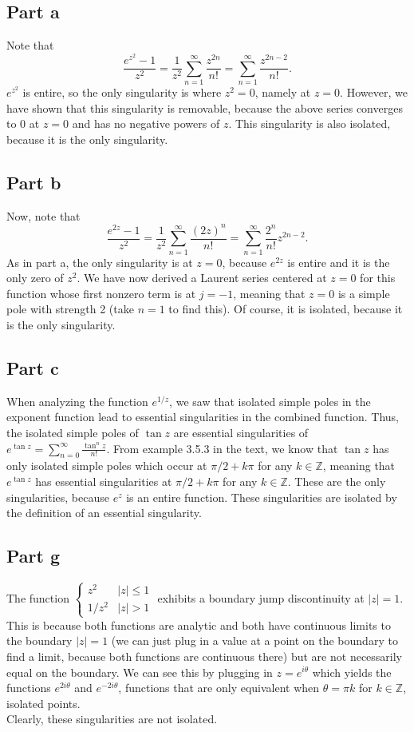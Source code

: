 \documentclass{article}
\begin{document}
\subsection{Part a}
Note that
\[
\frac{e^{z^2}-1}{z^2}=\frac{1}{z^2}\sum_{n=1}^\infty\frac{z^{2n}}{n!}=\sum_{n=1}^\infty\frac{z^{2n-2}}{n!}.
\]
$e^{z^2}$ is entire, so the only singularity is where $z^2=0$, namely at $z=0$. However, we have shown that this singularity is removable, because the above series converges to 0 at $z=0$ and has no negative powers of $z$. This singularity is also isolated, because it is the only singularity.  

\subsection{Part b}
Now, note that 
\[
\frac{e^{2z}-1}{z^2}=\frac{1}{z^2}\sum_{n=1}^\infty\frac{(2z)^n}{n!}=\sum_{n=1}^\infty\frac{2^n}{n!}z^{2n-2}.
\]
As in part a, the only singularity is at $z=0$, because $e^{2z}$ is entire and it is the only zero of $z^2$. We have now derived a Laurent series centered at $z=0$ for this function whose first nonzero term is at $j=-1$, meaning that $z=0$ is a simple pole with strength 2 (take $n=1$ to find this). Of course, it is isolated, because it is the only singularity.  

\subsection{Part c}
When analyzing the function $e^{1/z}$, we saw that isolated simple poles in the exponent function lead to essential singularities in the combined function. Thus, the isolated simple poles of $\tan{z}$ are essential singularities of $e^{\tan z}=\sum_{n=0}^\infty\frac{\tan^nz}{n!}$. From example 3.5.3 in the text, we know that $\tan{z}$ has only isolated simple poles which occur at $\pi/2+k\pi$ for any $k\in\mathbb{Z}$, meaning that $e^{\tan z}$ has essential singularities at $\pi/2+k\pi$ for any $k\in\mathbb{Z}$. These are the only singularities, because $e^z$ is an entire function. These singularities are isolated by the definition of an essential singularity. 

\subsection{Part g}
The function $\begin{cases} z^2 & |z| \leq 1 \\ 1/z^2 & |z| > 1 \end{cases}$ exhibits a boundary jump discontinuity at $|z|=1$. This is because both functions are analytic and both have continuous limits to the boundary $|z|=1$ (we can just plug in a value at a point on the boundary to find a limit, because both functions are continuous there) but are not necessarily equal on the boundary. We can see this by plugging in $z=e^{i\theta}$ which yields the functions $e^{2i\theta}$ and $e^{-2i\theta}$, functions that are only equivalent when $\theta=\pi k$ for $k\in\mathbb{Z}$, isolated points. \\Clearly, these singularities are not isolated. 
\end{document}
